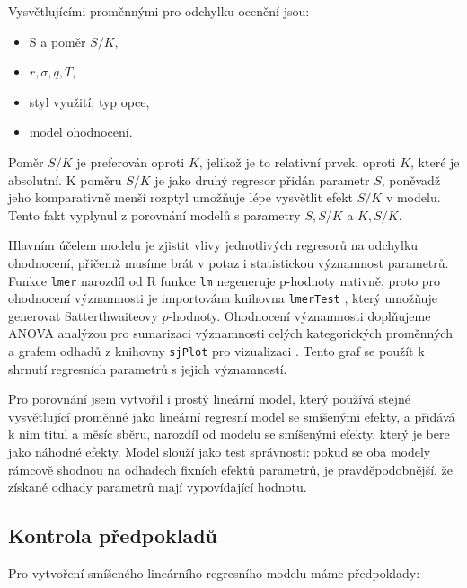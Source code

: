 \documentclass[male,czech,api_bc]{kitheses}
\begin{document}
  Vysvětlujícími proměnnými pro odchylku ocenění jsou:
  \begin{itemize}
    \item S a poměr $S/K$,
    \item $r, \sigma, q, T$,
    \item styl využití, typ opce,
    \item model ohodnocení.
  \end{itemize}

  Poměr $S/K$ je preferován oproti $K$, jelikož je to relativní prvek, oproti $K$, které je absolutní. K poměru $S/K$ je jako druhý regresor přidán parametr $S$, poněvadž jeho komparativně menší rozptyl umožňuje lépe vysvětlit efekt $S/K$ v modelu. Tento fakt vyplynul z porovnání modelů s parametry $S, S/K$ a $K, S/K$. 

  Hlavním účelem modelu je zjistit vlivy jednotlivých regresorů na odchylku ohodnocení, přičemž musíme brát v potaz i statistickou významnost parametrů. Funkce \texttt{lmer} narozdíl od R funkce \texttt{lm} negeneruje p-hodnoty nativně, proto pro ohodnocení významnosti je importována knihovna \texttt{lmerTest} \parencites{lmerTest}, který umožňuje generovat Satterthwaiteovy $p$-hodnoty. Ohodnocení významnosti doplňujeme ANOVA analýzou pro sumarizaci významnosti celých kategorických proměnných a grafem odhadů z knihovny \texttt{sjPlot} pro vizualizaci \parencites{sjPlot}. Tento graf se použít k shrnutí regresních parametrů s jejich významností. 
  
  Pro porovnání jsem vytvořil i prostý lineární model, který používá stejné vysvětlující proměnné jako lineární regresní model se smíšenými efekty, a přidává k nim titul a měsíc sběru, narozdíl od modelu se smíšenými efekty, který je bere jako náhodné efekty. Model slouží jako test správnosti: pokud se oba modely rámcově shodnou na odhadech fixních efektů parametrů, je pravděpodobnější, že získané odhady parametrů mají vypovídající hodnotu.

  \subsection{Kontrola předpokladů}

  Pro vytvoření smíšeného lineárního regresního modelu máme předpoklady:
\end{document}
